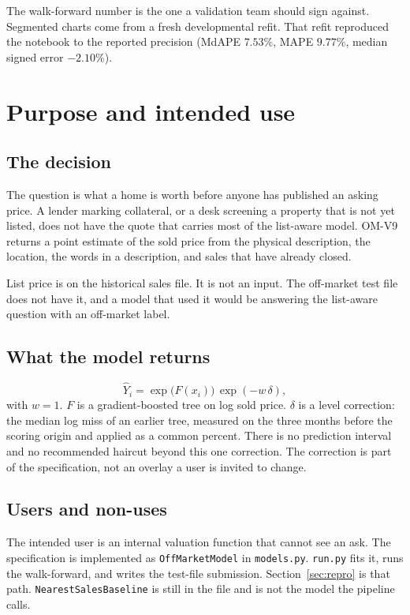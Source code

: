 \documentclass[11pt]{article}
\newcommand{\modelid}{OM-V9}
\begin{document}
The walk-forward number is the one a validation team should sign against. Segmented charts come from a fresh developmental refit. That refit reproduced the notebook to the reported precision (MdAPE \(7.53\%\), MAPE \(9.77\%\), median signed error \(-2.10\%\)).

\tableofcontents
\newpage

\section{Purpose and intended use}
\label{sec:purpose}

\subsection{The decision}

The question is what a home is worth before anyone has published an asking price. A lender marking collateral, or a desk screening a property that is not yet listed, does not have the quote that carries most of the list-aware model. \modelid{} returns a point estimate of the sold price from the physical description, the location, the words in a description, and sales that have already closed.

List price is on the historical sales file. It is not an input. The off-market test file does not have it, and a model that used it would be answering the list-aware question with an off-market label.

\subsection{What the model returns}

\[
\hat Y_i = \exp\bigl(F(x_i)\bigr)\,\exp(-w\,\delta),
\]
with \(w = 1\). \(F\) is a gradient-boosted tree on log sold price. \(\delta\) is a level correction: the median log miss of an earlier tree, measured on the three months before the scoring origin and applied as a common percent. There is no prediction interval and no recommended haircut beyond this one correction. The correction is part of the specification, not an overlay a user is invited to change.

\subsection{Users and non-uses}

The intended user is an internal valuation function that cannot see an ask. The specification is implemented as \texttt{OffMarketModel} in \texttt{models.py}. \texttt{run.py} fits it, runs the walk-forward, and writes the test-file submission. Section~\ref{sec:repro} is that path. \texttt{NearestSalesBaseline} is still in the file and is not the model the pipeline calls.
\end{document}
